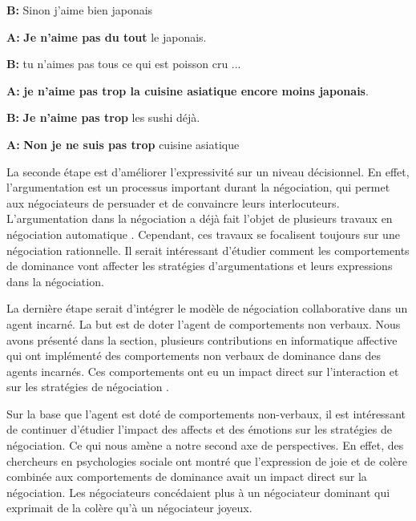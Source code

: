 	\begin{minipage}{\textwidth}
		{\ttfamily

			\begin{addmargin}[1em]{2em}%
				
				\vspace{0.5em}
			
				
					 \hspace*{3mm} \textbf{B:}  Sinon j'aime bien japonais 
				
				
					\textbf{A:} \textbf{Je n'aime pas du tout} le japonais.
				
					\hspace*{3mm} 	\textbf{B:} tu n'aimes pas tous ce qui est poisson cru ... 
				
					\textbf{A:}  \textbf{je n'aime pas trop la cuisine asiatique encore moins japonais}.
					
					\hspace*{3mm} 	\textbf{B:} \textbf{Je n'aime pas trop }les sushi déjà.
					
					\textbf{A:} \textbf{Non je ne suis pas trop} cuisine asiatique
					\vspace{1.5em}
			\end{addmargin}
		} 
	\end{minipage}

	La seconde étape est d'améliorer l'expressivité sur un niveau décisionnel. En effet, l'argumentation est un processus important durant la négociation, qui permet aux négociateurs de persuader et de convaincre leurs interlocuteurs. L'argumentation dans la négociation a déjà fait l'objet de plusieurs travaux en négociation automatique \cite{toni2010argumentative,oliva2010argumentation}. Cependant, ces travaux se focalisent toujours sur une négociation rationnelle. Il serait intéressant d'étudier comment les comportements de dominance vont affecter les stratégies d'argumentations et leurs expressions dans la négociation.
	
	La dernière étape serait d'intégrer le modèle de négociation collaborative dans un agent incarné. La but est de doter l'agent de comportements non verbaux. Nous avons présenté dans la section, plusieurs contributions en informatique affective qui ont implémenté des comportements non verbaux de dominance dans des agents incarnés. Ces comportements ont eu un impact direct sur l'interaction et sur les stratégies de négociation \cite{de2011effect,de2015humans}. 
	
	Sur la base que l'agent est doté de comportements non-verbaux, il est intéressant de continuer d'étudier l'impact des affects et des émotions sur les stratégies de négociation. Ce qui nous amène a notre second axe de perspectives. En effet, des chercheurs en psychologies sociale \cite{van2006power} ont montré que l'expression de  joie et de colère combinée aux comportements de dominance avait un impact direct sur la négociation. Les négociateurs concédaient plus à un négociateur dominant qui exprimait de la colère qu'à un négociateur joyeux. 
	
